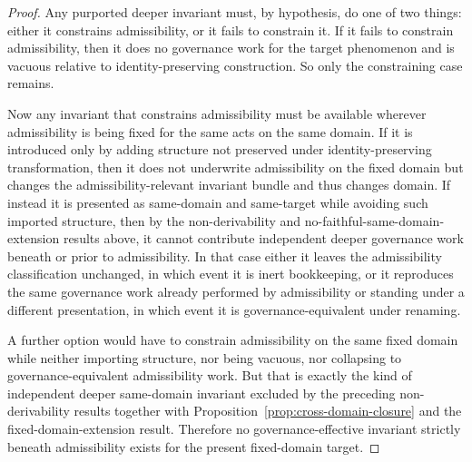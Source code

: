 \documentclass[11pt]{article}
\theoremstyle{definition}
\theoremstyle{remark}
\begin{document}
\begin{proof}
Any purported deeper invariant must, by hypothesis, do one of two things: either it constrains admissibility, or it fails to constrain it. If it fails to constrain admissibility, then it does no governance work for the target phenomenon and is vacuous relative to identity-preserving construction. So only the constraining case remains.

Now any invariant that constrains admissibility must be available wherever admissibility is being fixed for the same acts on the same domain. If it is introduced only by adding structure not preserved under identity-preserving transformation, then it does not underwrite admissibility on the fixed domain but changes the admissibility-relevant invariant bundle and thus changes domain. If instead it is presented as same-domain and same-target while avoiding such imported structure, then by the non-derivability and no-faithful-same-domain-extension results above, it cannot contribute independent deeper governance work beneath or prior to admissibility. In that case either it leaves the admissibility classification unchanged, in which event it is inert bookkeeping, or it reproduces the same governance work already performed by admissibility or standing under a different presentation, in which event it is governance-equivalent under renaming.

A further option would have to constrain admissibility on the same fixed domain while neither importing structure, nor being vacuous, nor collapsing to governance-equivalent admissibility work. But that is exactly the kind of independent deeper same-domain invariant excluded by the preceding non-derivability results together with Proposition~\ref{prop:cross-domain-closure} and the fixed-domain-extension result. Therefore no governance-effective invariant strictly beneath admissibility exists for the present fixed-domain target.
\end{proof}
\end{document}
